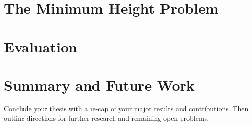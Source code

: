 \chapter{The Minimum Height Problem}
\label{chapter:minheightproblem}





\chapter{Evaluation}  
\label{chapter:evaluation}



\chapter{Summary and Future Work}
\label{chapter:summary}

Conclude your thesis with a re-cap of your major results and contributions.  Then outline directions for further research and remaining open problems.